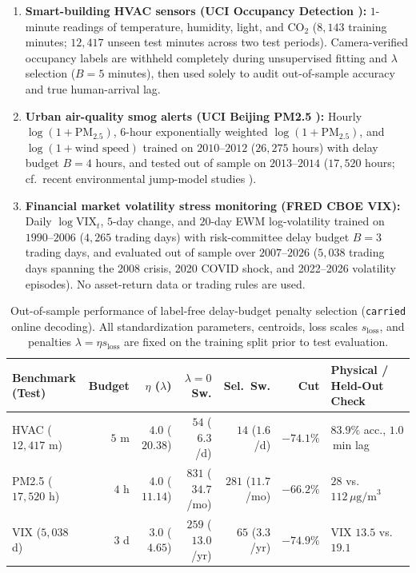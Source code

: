 \documentclass[11pt]{article}
\begin{document}
\begin{enumerate}
  \item \textbf{Smart-building HVAC sensors (UCI Occupancy Detection \cite{candanedo2016}):} $1$-minute readings of temperature, humidity, light, and $\mathrm{CO}_2$ ($8,143$ training minutes; $12,417$ unseen test minutes across two test periods). Camera-verified occupancy labels are withheld completely during unsupervised fitting and $\lambda$ selection ($B = 5$ minutes), then used solely to audit out-of-sample accuracy and true human-arrival lag.
  \item \textbf{Urban air-quality smog alerts (UCI Beijing PM2.5 \cite{liang2015}):} Hourly $\log(1+\mathrm{PM}_{2.5})$, $6$-hour exponentially weighted $\log(1+\mathrm{PM}_{2.5})$, and $\log(1+\text{wind speed})$ trained on $2010$--$2012$ ($26,275$ hours) with delay budget $B = 4$ hours, and tested out of sample on $2013$--$2014$ ($17,520$ hours; cf.\ recent environmental jump-model studies \cite{cortese2024air}).
  \item \textbf{Financial market volatility stress monitoring (FRED CBOE VIX):} Daily $\log\mathrm{VIX}_t$, $5$-day change, and $20$-day EWM log-volatility trained on $1990$--$2006$ ($4,265$ trading days) with risk-committee delay budget $B = 3$ trading days, and evaluated out of sample over $2007$--$2026$ ($5,038$ trading days spanning the 2008 crisis, 2020 COVID shock, and 2022--2026 volatility episodes). No asset-return data or trading rules are used.
\end{enumerate}

\begin{table}[t]
\centering
\caption{Out-of-sample performance of label-free delay-budget penalty selection (\texttt{carried} online decoding). All standardization parameters, centroids, loss scales $s_{\mathrm{loss}}$, and penalties $\lambda = \eta s_{\mathrm{loss}}$ are fixed on the training split prior to test evaluation.}
\label{tab:summary}
\footnotesize
\setlength{\tabcolsep}{4.5pt}
\begin{tabular}{@{}lrrrrrl@{}}
\toprule
Benchmark (Test) & Budget & $\eta$ ($\lambda$) & $\lambda=0$ Sw. & Sel.\ Sw. & Cut & Physical / Held-Out Check \\
\midrule
HVAC ($12{,}417$ m) & $5$ m & $4.0$ ($20.38$) & $54$ ($6.3$/d) & $14$ ($1.6$/d) & $-74.1\%$ & $83.9\%$ acc., $1.0$\,min lag \\
PM2.5 ($17{,}520$ h) & $4$ h & $4.0$ ($11.14$) & $831$ ($34.7$/mo) & $281$ ($11.7$/mo) & $-66.2\%$ & $28$ vs.\ $112\,\mu\text{g/m}^3$ \\
VIX ($5{,}038$ d) & $3$ d & $3.0$ ($4.65$) & $259$ ($13.0$/yr) & $65$ ($3.3$/yr) & $-74.9\%$ & VIX $13.5$ vs.\ $19.1$ \\
\bottomrule
\end{tabular}
\end{table}
\end{document}
